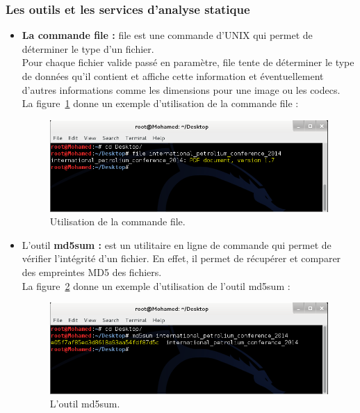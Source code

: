 \subsubsection{Les outils et les services d'analyse statique}
\begin{itemize}
\item \textbf{La commande file : }file est une commande d'UNIX qui permet de déterminer le type d'un fichier.\\
Pour chaque fichier valide passé en paramètre, file tente de déterminer le type de données qu'il contient et affiche cette information et éventuellement d'autres informations comme les dimensions pour une image ou les codecs.\\
La figure~\ref{fig :file} donne un exemple d'utilisation de la commande file :
\begin{figure}[H]
\begin{center}
\includegraphics[scale=0.7]{Figures/file.png}
\caption{Utilisation de la commande file.}
\label{fig :file} 
\end{center}
\end{figure}
\item L'outil \textbf{md5sum : }est un utilitaire en ligne de commande qui permet de vérifier l'intégrité d'un fichier. En effet, il permet de récupérer et comparer des empreintes MD5 des fichiers.\\
La figure~\ref{fig :md5} donne un exemple d'utilisation de l'outil md5sum :
\begin{figure}[H]
\begin{center}
\includegraphics[scale=0.7]{Figures/md5sum.png}
\caption{L'outil md5sum.}
\label{fig :md5} 

\end{center}
\end{figure}
\end{itemize}
